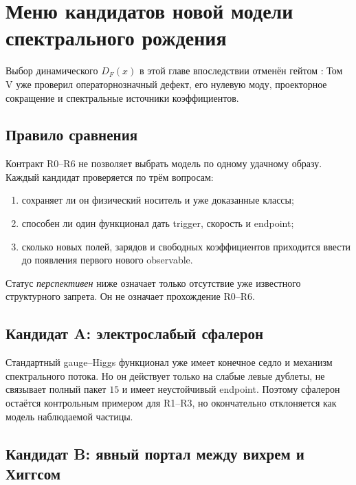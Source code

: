 \chapter{Меню кандидатов новой модели спектрального рождения}
\label{ch:v6-spectral-transition-new-model-candidate-menu-gate}

\begin{remark}
Выбор динамического $D_F(x)$ в этой главе впоследствии отменён гейтом
:
Том V уже проверил операторнозначный дефект, его нулевую моду,
проекторное сокращение и спектральные источники коэффициентов.
\end{remark}

\section{Правило сравнения}

Контракт R0--R6 не позволяет выбрать модель по одному удачному образу.
Каждый кандидат проверяется по трём вопросам:
\begin{enumerate}
 \item сохраняет ли он физический носитель и уже доказанные классы;
 \item способен ли один функционал дать trigger, скорость и endpoint;
 \item сколько новых полей, зарядов и свободных коэффициентов приходится
 ввести до появления первого нового observable.
\end{enumerate}

Статус \emph{перспективен} ниже означает только отсутствие уже известного
структурного запрета. Он не означает прохождение R0--R6.

\section{Кандидат A: электрослабый сфалерон}

Стандартный gauge--Higgs функционал уже имеет конечное седло и механизм
спектрального потока. Но он действует только на слабые левые дублеты,
не связывает полный пакет $15$ и имеет неустойчивый endpoint. Поэтому
сфалерон остаётся контрольным примером для R1--R3, но окончательно
отклоняется как модель наблюдаемой частицы.

\section{Кандидат B: явный портал между вихрем и Хиггсом}


